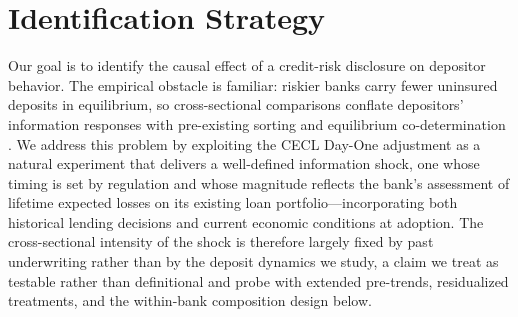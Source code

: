 
\section{Identification Strategy}
\label{sec:identification}

Our goal is to identify the causal effect of a credit-risk disclosure on
depositor behavior.  The empirical obstacle is familiar: riskier banks
carry fewer uninsured deposits in equilibrium, so cross-sectional comparisons
conflate depositors' information responses with pre-existing sorting and
equilibrium co-determination \citep{covitz2004market, chen2022bank}.
We address this problem by exploiting the CECL Day-One adjustment as a
natural experiment that delivers a well-defined information shock, one whose
timing is set by regulation and whose magnitude reflects the bank's assessment
of lifetime expected losses on its existing loan portfolio---incorporating both
historical lending decisions and current economic conditions at adoption.  The
cross-sectional intensity of the shock is therefore largely fixed by past
underwriting rather than by the deposit dynamics we study, a claim we treat as
testable rather than definitional and probe with extended pre-trends,
residualized treatments, and the within-bank composition design below.

